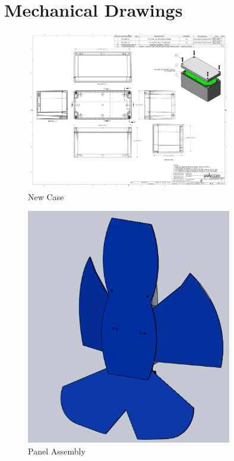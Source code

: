 \documentclass{article}
\numberwithin{figure}{section}
\numberwithin{equation}{section}
\begin{document}
{\begin{figure}[H]
	\caption{}
	\label{fig:bom2}
\end{figure}


\newpage
\section{Mechanical Drawings} \label{sect:appendixC}
\begin{figure}[H]
	\centering
	\includegraphics[width=0.8\textwidth]{NewCase.pdf}
	\caption{New Case}
	\label{fig:append_new_case}
\end{figure}

\begin{figure}[H]
	\centering
	\includegraphics[width=0.8\textwidth]{NewAssembly}
	\caption{Panel Assembly}
	\label{fig:append_panel_assembly}
\end{figure}

}
\end{document}
